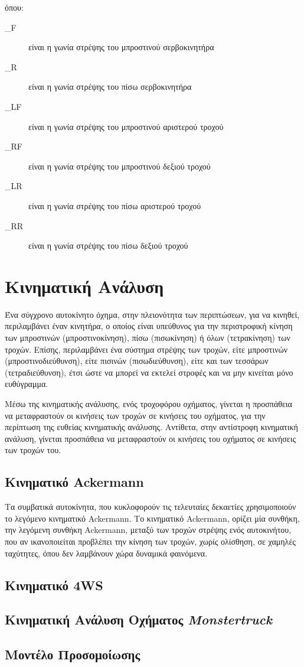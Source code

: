όπου:

\begin{description}
	\item[\theta_{F}] είναι η γωνία στρέψης του μπροστινού σερβοκινητήρα
	\item[\theta_{R}] είναι η γωνία στρέψης του πίσω σερβοκινητήρα
	\item[\delta_{LF}] είναι η γωνία στρέψης του μπροστινού αριστερού τροχού
	\item[\delta_{RF}] είναι η γωνία στρέψης του μπροστινού δεξιού τροχού
	\item[\delta_{LR}] είναι η γωνία στρέψης του πίσω αριστερού τροχού
	\item[\delta_{RR}] είναι η γωνία στρέψης του πίσω δεξιού τροχού
\end{description}


\section{Κινηματική Ανάλυση}
Ένα σύγχρονο αυτοκίνητο όχημα, στην πλειονότητα των περιπτώσεων, για να κινηθεί, περιλαμβάνει έναν κινητήρα, ο οποίος είναι υπεύθυνος για την περιστροφική κίνηση των μπροστινών (μπροστινοκίνηση), πίσω (πισωκίνηση) ή όλων (τετρακίνηση) των τροχών. Επίσης, περιλαμβάνει ένα σύστημα στρέψης των τροχών, είτε μπροστινών (μπροστινοδιεύθυνση), είτε πισινών (πισωδιεύθυνση), είτε και των τεσσάρων (τετραδιεύθυνση), έτσι ώστε να μπορεί να εκτελεί στροφές και να μην κινείται μόνο ευθύγραμμα.

\bigskip
Μέσω της κινηματικής ανάλυσης, ενός τροχοφόρου οχήματος, γίνεται η προσπάθεια να μεταφραστούν οι κινήσεις των τροχών σε κινήσεις του οχήματος, για την περίπτωση της ευθείας κινηματικής ανάλυσης. Αντίθετα, στην αντίστροφη κινηματική ανάλυση, γίνεται προσπάθεια να μεταφραστούν οι κινήσεις του οχήματος σε κινήσεις των τροχών του.

\subsection{Κινηματικό Ackermann}
Τα συμβατικά αυτοκίνητα, που κυκλοφορούν τις τελευταίες δεκαετίες χρησιμοποιούν το λεγόμενο κινηματικό Ackermann. Το κινηματικό Ackermann, ορίζει μία συνθήκη, την λεγόμενη συνθήκη Ackermann, μεταξύ των τροχών στρέψης ενός αυτοκινήτου, που αν ικανοποιείται προβλέπει την κίνηση των τροχών, χωρίς ολίσθηση, σε χαμηλές ταχύτητες, όπου δεν λαμβάνουν χώρα δυναμικά φαινόμενα.










\subsection{Κινηματικό 4WS}
\subsection{Κινηματική Ανάλυση Οχήματος \textit{Monstertruck}}
\subsection{Μοντέλο Προσομοίωσης}